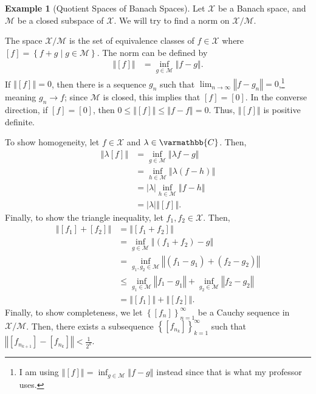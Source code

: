 \documentclass[12pt]{extarticle}
\newcommand{\C}{\mathbb{C}}
\newcommand{\norm}[1]{\left\Vert #1\right\Vert}
\newcommand{\set}[1]{\left\{#1\right\}}
\theoremstyle{plain}
\theoremstyle{definition}
\newtheorem*{example}{Example}
\theoremstyle{note}
\renewcommand*{\mathbb}[1]{\varmathbb{#1}}
\renewcommand{\newline}{\hfill\break}
\begin{document}
\begin{example}[Quotient Spaces of Banach Spaces]
  Let $\mathcal{X}$ be a Banach space, and $\mathcal{M}$ be a closed subspace of $\mathcal{X}$. We will try to find a norm on $\mathcal{X}/\mathcal{M}$.\newline

  The space $\mathcal{X}/\mathcal{M}$ is the set of equivalence classes of $f\in \mathcal{X}$ where $[f] = \set{f + g\mid g\in \mathcal{M}}$. The norm can be defined by
  \begin{align*}
    \norm{[f]} &= \inf_{g\in \mathcal{M}}\norm{f-g}.
  \end{align*}
  If $\norm{[f]} = 0$, then there is a sequence $g_n$ such that $\lim_{n\rightarrow\infty}\norm{f - g_n} = 0$,\footnote{I am using $\norm{[f]} = \inf_{g\in \mathcal{M}}\norm{f-g}$ instead since that is what my professor uses.} meaning $g_n \rightarrow f$; since $\mathcal{M}$ is closed, this implies that $[f] = [0]$. In the converse direction, if $[f] = [0]$, then $0\leq \norm{[f]} \leq \norm{f-f} = 0$. Thus, $\norm{[f]}$ is positive definite.\newline

  To show homogeneity, let $f\in \mathcal{X}$ and $\lambda \in \C$. Then,
  \begin{align*}
    \norm{\lambda[f]} &= \inf_{g\in \mathcal{M}}\norm{\lambda f - g}\\
                      &= \inf_{h\in \mathcal{M}}\norm{\lambda\left(f - h\right)}\\
                      &= |\lambda|\inf_{h\in \mathcal{M}}\norm{f - h}\\
                      &= |\lambda|\norm{[f]}.
  \end{align*}
  Finally, to show the triangle inequality, let $f_1,f_2\in \mathcal{X}$. Then,
  \begin{align*}
    \norm{[f_1] + [f_2]} &= \norm{[f_1 + f_2]}\\
                         &= \inf_{g\in \mathcal{M}}\norm{\left(f_1 + f_2\right) - g}\\
                         &= \inf_{g_1,g_2\in \mathcal{M}}\norm{(f_1 - g_1) + (f_2 - g_2)}\\
                         &\leq \inf_{g_1\in \mathcal{M}}\norm{f_1 - g_1} + \inf_{g_2\in \mathcal{M}}\norm{f_2 - g_2}\\
                         &= \norm{[f_1]} + \norm{[f_2]}.
  \end{align*}
  Finally, to show completeness, we let $\set{[f_n]}_{n=1}^{\infty}$ be a Cauchy sequence in $\mathcal{X}/\mathcal{M}$. Then, there exists a subsequence $\set{\left[f_{n_k}\right]}_{k=1}^{\infty}$ such that $\norm{\left[f_{n_{k+1}}\right] - \left[f_{n_k}\right]} < \frac{1}{2^k}$.\newline


\end{example}
\end{document}
